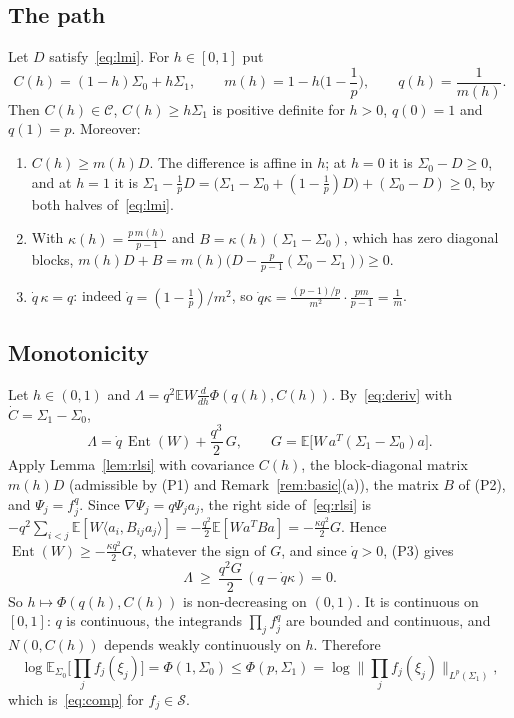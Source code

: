 \documentclass[11pt]{amsart}
\theoremstyle{definition}
\newcommand{\E}{\mathbb{E}}
\newcommand{\Ent}{\operatorname{Ent}}
\newcommand{\cS}{\mathcal{S}}
\begin{document}
\subsection{The path}\label{sec:segment}
Let $D$ satisfy~\eqref{eq:lmi}. For $h\in[0,1]$ put
\[
C(h)=(1-h)\Sigma_0+h\Sigma_1,\qquad m(h)=1-h\Big(1-\frac1p\Big),\qquad q(h)=\frac1{m(h)} .
\]
Then $C(h)\in\mathcal C$, $C(h)\ge h\Sigma_1$ is positive definite for $h>0$, $q(0)=1$ and $q(1)=p$. Moreover:
\begin{enumerate}[label=(P\arabic*)]
\item $C(h)\ge m(h)D$. The difference is affine in $h$; at $h=0$ it is $\Sigma_0-D\ge0$, and at $h=1$ it is
$\Sigma_1-\frac1pD=\big(\Sigma_1-\Sigma_0+(1-\frac1p)D\big)+(\Sigma_0-D)\ge0$, by both halves of~\eqref{eq:lmi}.
\item With $\kappa(h)=\frac{p\,m(h)}{p-1}$ and $B=\kappa(h)(\Sigma_1-\Sigma_0)$, which has zero diagonal blocks,
$m(h)D+B=m(h)\big(D-\frac p{p-1}(\Sigma_0-\Sigma_1)\big)\ge0$.
\item $\dot q\,\kappa=q$: indeed $\dot q=(1-\frac1p)/m^2$, so $\dot q\kappa=\frac{(p-1)/p}{m^2}\cdot\frac{pm}{p-1}=\frac1m$.
\end{enumerate}

\subsection{Monotonicity}\label{sec:mono}
Let $h\in(0,1)$ and $\Lambda=q^2\E W\frac{d}{dh}\Phi(q(h),C(h))$. By~\eqref{eq:deriv} with $\dot C=\Sigma_1-\Sigma_0$,
\[
\Lambda=\dot q\,\Ent(W)+\frac{q^3}2\,G,\qquad G=\E\big[W\,a^T(\Sigma_1-\Sigma_0)a\big].
\]
Apply Lemma~\ref{lem:rlsi} with covariance $C(h)$, the block-diagonal matrix $m(h)D$ (admissible by (P1) and
Remark~\ref{rem:basic}(a)), the matrix $B$ of (P2), and $\Psi_j=f_j^q$. Since $\nabla\Psi_j=q\Psi_ja_j$, the right side
of~\eqref{eq:rlsi} is $-q^2\sum_{i<j}\E[W\langle a_i,B_{ij}a_j\rangle]=-\frac{q^2}2\E[Wa^TBa]=-\frac{\kappa q^2}2G$.
Hence $\Ent(W)\ge-\frac{\kappa q^2}2G$, whatever the sign of $G$, and since $\dot q>0$, (P3) gives
\[
\Lambda\ \ge\ \frac{q^2G}2\,(q-\dot q\kappa)=0 .
\]
So $h\mapsto\Phi(q(h),C(h))$ is non-decreasing on $(0,1)$. It is continuous on $[0,1]$: $q$ is continuous, the
integrands $\prod_jf_j^q$ are bounded and continuous, and $N(0,C(h))$ depends weakly continuously on $h$. Therefore
\[
\log\E_{\Sigma_0}\Big[\prod_jf_j(\xi_j)\Big]=\Phi(1,\Sigma_0)\le\Phi(p,\Sigma_1)=\log\Big\|\prod_jf_j(\xi_j)\Big\|_{L^p(\Sigma_1)},
\]
which is~\eqref{eq:comp} for $f_j\in\cS$.
\end{document}
